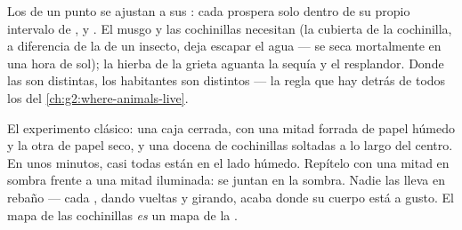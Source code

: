 \begin{proposition}\label{prop:g6:exploring-our-environment:decide}
Los  de un punto se ajustan a sus : cada 
prospera solo dentro de su propio intervalo de ,  y
. El musgo y las cochinillas necesitan  (la cubierta de la
cochinilla, a diferencia de la de un insecto, deja escapar el agua ---
se seca mortalmente en una hora de sol); la hierba de la grieta
aguanta la sequía y el resplandor. Donde las  son
distintas, los habitantes son distintos --- la regla que hay detrás de
todos los  del \cref{ch:g2:where-animals-live}.
\end{proposition}
\admitted

\begin{example}\label{ex:g6:exploring-our-environment:chooser}
El experimento clásico: una caja cerrada, con una mitad forrada de
papel húmedo y la otra de papel seco, y una docena de cochinillas
soltadas a lo largo del centro. En unos minutos, casi todas están en
el lado húmedo. Repítelo con una mitad en sombra frente a una mitad
iluminada: se juntan en la sombra. Nadie las lleva en rebaño --- cada
, dando vueltas y girando, acaba donde su cuerpo está a gusto.
El mapa de las cochinillas \emph{es} un mapa de la .
\end{example}

